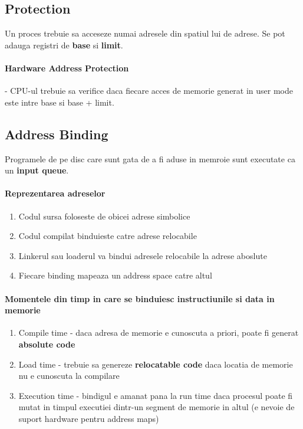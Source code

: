 \documentclass{article}
\begin{document}
\subsection*{Protection}
Un proces trebuie sa acceseze numai adresele din spatiul lui de adrese. Se pot adauga registri de \textbf{base} si \textbf{limit}.
\paragraph*{Hardware Address Protection} - CPU-ul trebuie sa verifice daca fiecare acces de memorie generat in user mode este intre base si base + limit.
\subsection*{Address Binding}
Programele de pe disc care sunt gata de a fi aduse in memroie sunt executate ca un \textbf{input queue}.
\paragraph*{Reprezentarea adreselor}
\begin{enumerate}
    \item Codul sursa foloseste de obicei adrese simbolice
    \item Codul compilat binduieste catre adrese relocabile
    \item Linkerul sau loaderul va bindui adresele relocabile la adrese aboslute
    \item Fiecare binding mapeaza un address space catre altul
\end{enumerate}
\paragraph*{Momentele din timp in care se binduiesc instructiunile si data in memorie}
\begin{enumerate}
    \item Compile time - daca adresa de memorie e cunoscuta a priori, poate fi generat \textbf{absolute code}
    \item Load time - trebuie sa genereze \textbf{relocatable code} daca locatia de memorie nu e cunoscuta la compilare
    \item Execution time - bindigul e amanat pana la run time daca procesul poate fi mutat in timpul executiei dintr-un segment de memorie in altul (e nevoie de suport hardware pentru address maps)
\end{enumerate}
\end{document}
